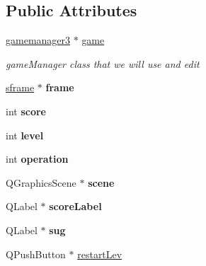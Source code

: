 \subsection*{\-Public \-Attributes}
\begin{DoxyCompactItemize}
\item 
\hypertarget{classrestartwindow_adfbb6e8730242e93735ecf9701b76dc1}{\hyperlink{classgamemanager3}{gamemanager3} $\ast$ \hyperlink{classrestartwindow_adfbb6e8730242e93735ecf9701b76dc1}{game}}\label{classrestartwindow_adfbb6e8730242e93735ecf9701b76dc1}

\begin{DoxyCompactList}\small\item\em game\-Manager class that we will use and edit \end{DoxyCompactList}\item 
\hypertarget{classrestartwindow_ab77873aca0ff9b052c3279a853def78d}{\hyperlink{classsframe}{sframe} $\ast$ {\bfseries frame}}\label{classrestartwindow_ab77873aca0ff9b052c3279a853def78d}

\item 
\hypertarget{classrestartwindow_abfe75dbcfab7ec0da17ec60cc2d259a2}{int {\bfseries score}}\label{classrestartwindow_abfe75dbcfab7ec0da17ec60cc2d259a2}

\item 
\hypertarget{classrestartwindow_a689bd83a45097c198b39c90263b5d08a}{int {\bfseries level}}\label{classrestartwindow_a689bd83a45097c198b39c90263b5d08a}

\item 
\hypertarget{classrestartwindow_a741f26a756e7d790cfb1702f97c4f8a5}{int {\bfseries operation}}\label{classrestartwindow_a741f26a756e7d790cfb1702f97c4f8a5}

\item 
\hypertarget{classrestartwindow_a2478db240e9004452b756ea9bb303d73}{\-Q\-Graphics\-Scene $\ast$ {\bfseries scene}}\label{classrestartwindow_a2478db240e9004452b756ea9bb303d73}

\item 
\hypertarget{classrestartwindow_ac6a36237a4e78fb3bd0ad94c50b0e8e7}{\-Q\-Label $\ast$ {\bfseries score\-Label}}\label{classrestartwindow_ac6a36237a4e78fb3bd0ad94c50b0e8e7}

\item 
\hypertarget{classrestartwindow_ae5cad08f42c14e8be53e93c4c36a1426}{\-Q\-Label $\ast$ {\bfseries sug}}\label{classrestartwindow_ae5cad08f42c14e8be53e93c4c36a1426}

\item 
\hypertarget{classrestartwindow_a68d49a6b8d89cc6dab021c284215846b}{\-Q\-Push\-Button $\ast$ \hyperlink{classrestartwindow_a68d49a6b8d89cc6dab021c284215846b}{restart\-Lev}}\label{classrestartwindow_a68d49a6b8d89cc6dab021c284215846b}


\end{DoxyCompactItemize}
